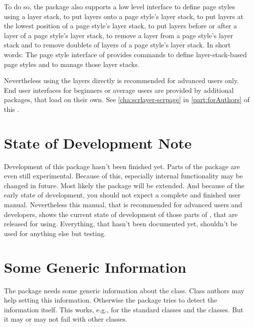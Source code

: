 To do so, the package also supports a low level interface to define page
styles using a layer stack, to put layers onto a page style's layer stack, to
put layers at the lowest position of a page style's layer stack, to put layers
before or after a layer of a page style's layer stack, to remove a layer from
a page style's layer stack and to remove doublets of layers of a page style's
layer stack. In short words: The page style interface of 
provides commands to define layer-stack-based page styles and to manage those
layer stacks.

Nevertheless using the layers directly is recommended for advanced users only.
End user interfaces for beginners or average users are provided by additional
packages, that load  on their own. See
\autoref{cha:scrlayer-scrpage} in \autoref{part:forAuthors} of this
.

\section{State of Development Note}
\label{sec:scrlayer.draft}

Development of this package hasn't been finished yet. Parts of the package are
even still experimental. Because of this,
especially internal functionality may be changed in future. Most likely the
package will be extended. And because of the early state of development, you
should not expect a complete and finished user manual. Nevertheless this
manual, that is recommended for advanced users and developers, shows the
current state of development of those parts of , that are
released for using. Everything, that hasn't been documented yet, shouldn't be
used for anything else but testing.


\section{Some Generic Information}
\label{sec:scrlayer.generic}

The package needs some generic information about the class. Class authors may
help  setting this information. Otherwise the package tries
to detect the information itself. This works, e.g., for the standard classes
and the \KOMAScript{} classes. But it may or may not fail with other classes.

